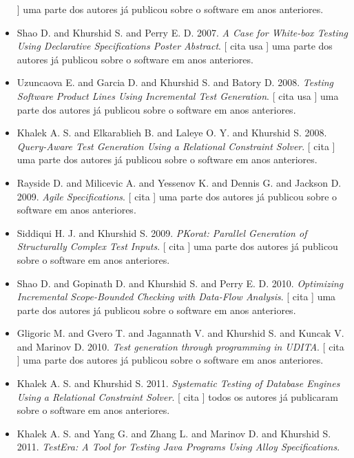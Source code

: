 \begin{itemize}
      ]
uma parte dos autores já publicou sobre o software em anos anteriores.
\item Shao D. and Khurshid S. and Perry E. D.
      2007.
        \textit{ A Case for White-box Testing Using Declarative Specifications Poster Abstract}.
      [
          cita
          usa
      ]
uma parte dos autores já publicou sobre o software em anos anteriores.
\item Uzuncaova E. and Garcia D. and Khurshid S. and Batory D.
      2008.
        \textit{ Testing Software Product Lines Using Incremental Test Generation}.
      [
          cita
          usa
      ]
uma parte dos autores já publicou sobre o software em anos anteriores.
\item Khalek A. S. and Elkarablieh B. and Laleye O. Y. and Khurshid S.
      2008.
        \textit{ Query-Aware Test Generation Using a Relational Constraint Solver}.
      [
          cita
      ]
uma parte dos autores já publicou sobre o software em anos anteriores.
\item Rayside D. and Milicevic A. and Yessenov K. and Dennis G. and Jackson D.
      2009.
        \textit{ Agile Specifications}.
      [
          cita
      ]
uma parte dos autores já publicou sobre o software em anos anteriores.
\item Siddiqui H. J. and Khurshid S.
      2009.
        \textit{ PKorat: Parallel Generation of Structurally Complex Test Inputs}.
      [
          cita
      ]
uma parte dos autores já publicou sobre o software em anos anteriores.
\item Shao D. and Gopinath D. and Khurshid S. and Perry E. D.
      2010.
        \textit{ Optimizing Incremental Scope-Bounded Checking with Data-Flow Analysis}.
      [
          cita
      ]
uma parte dos autores já publicou sobre o software em anos anteriores.
\item Gligoric M. and Gvero T. and Jagannath V. and Khurshid S. and Kuncak V. and Marinov D.
      2010.
        \textit{ Test generation through programming in UDITA}.
      [
          cita
      ]
uma parte dos autores já publicou sobre o software em anos anteriores.
\item Khalek A. S. and Khurshid S.
      2011.
        \textit{ Systematic Testing of Database Engines Using a Relational Constraint Solver}.
      [
          cita
      ]
todos os autores já publicaram sobre o software em anos anteriores.
\item Khalek A. S. and Yang G. and Zhang L. and Marinov D. and Khurshid S.
      2011.
        \textit{ TestEra: A Tool for Testing Java Programs Using Alloy Specifications}.

\end{itemize}
